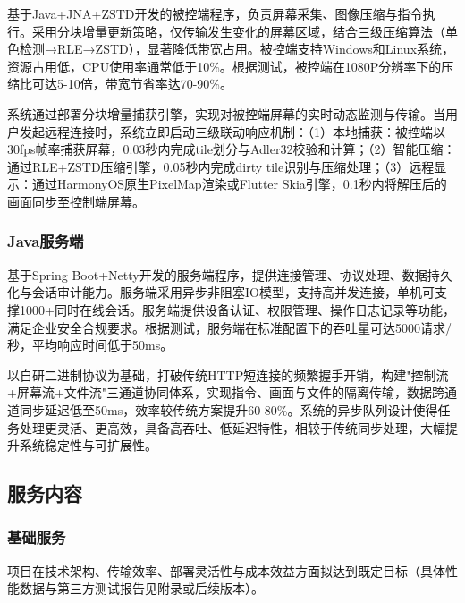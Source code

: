 \documentclass[12pt,a4paper]{article}
\begin{document}
基于Java+JNA+ZSTD开发的被控端程序，负责屏幕采集、图像压缩与指令执行。采用分块增量更新策略，仅传输发生变化的屏幕区域，结合三级压缩算法（单色检测→RLE→ZSTD），显著降低带宽占用。被控端支持Windows和Linux系统，资源占用低，CPU使用率通常低于10\%。根据测试，被控端在1080P分辨率下的压缩比可达5-10倍，带宽节省率达70-90\%。

系统通过部署分块增量捕获引擎，实现对被控端屏幕的实时动态监测与传输。当用户发起远程连接时，系统立即启动三级联动响应机制：（1）本地捕获：被控端以30fps帧率捕获屏幕，0.03秒内完成tile划分与Adler32校验和计算；（2）智能压缩：通过RLE+ZSTD压缩引擎，0.05秒内完成dirty tile识别与压缩处理；（3）远程显示：通过HarmonyOS原生PixelMap渲染或Flutter Skia引擎，0.1秒内将解压后的画面同步至控制端屏幕。

\subsubsection{Java服务端}

基于Spring Boot+Netty开发的服务端程序，提供连接管理、协议处理、数据持久化与会话审计能力。服务端采用异步非阻塞IO模型，支持高并发连接，单机可支撑1000+同时在线会话。服务端提供设备认证、权限管理、操作日志记录等功能，满足企业安全合规要求。根据测试，服务端在标准配置下的吞吐量可达5000请求/秒，平均响应时间低于50ms。

以自研二进制协议为基础，打破传统HTTP短连接的频繁握手开销，构建"控制流+屏幕流+文件流"三通道协同体系，实现指令、画面与文件的隔离传输，数据跨通道同步延迟低至50ms，效率较传统方案提升60-80\%。系统的异步队列设计使得任务处理更灵活、更高效，具备高吞吐、低延迟特性，相较于传统同步处理，大幅提升系统稳定性与可扩展性。

\subsection{服务内容}

\subsubsection{基础服务}

项目在技术架构、传输效率、部署灵活性与成本效益方面拟达到既定目标（具体性能数据与第三方测试报告见附录或后续版本）。
\end{document}
